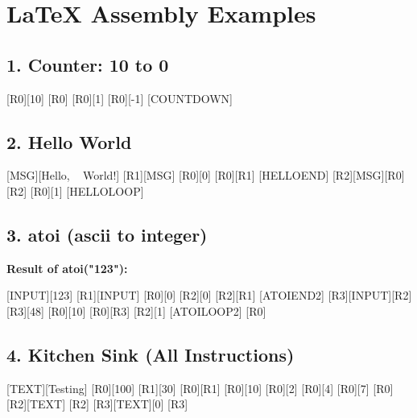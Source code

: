 \documentclass{article}
\begin{document}
\section*{LaTeX Assembly Examples}

\subsection*{1. Counter: 10 to 0}
\begin{latexasm}
    [R0][10]
    [R0]
    [R0][1]
    [R0][-1]
    [COUNTDOWN]
\end{latexasm}

\subsection*{2. Hello World}
\begin{latexasm}
    [MSG][Hello, ~ World!]
    [R1][MSG]
    [R0][0]
    [R0][R1]
    [HELLOEND]
    [R2][MSG][R0]
    [R2]
    [R0][1]
    [HELLOLOOP]
\end{latexasm}

\subsection*{3. atoi (ascii to integer)}
\textbf{Result of atoi("123"):}
\begin{latexasm}%
    [INPUT][123]%
    [R1][INPUT]%
    [R0][0]%
    [R2][0]%
    [R2][R1]%
    [ATOIEND2]%
    [R3][INPUT][R2]%
    [R3][48]%
    [R0][10]%
    [R0][R3]%
    [R2][1]%
    [ATOILOOP2]%
    [R0]%
\end{latexasm}%

\subsection*{4. Kitchen Sink (All Instructions)}
\begin{latexasm}
    [TEXT][Testing]
    [R0][100]
    [R1][30]
    [R0][R1]      %
    [R0][10]      %
    [R0][2]       %
    [R0][4]       %
    [R0][7]       %
    [R0]        %
    [R2][TEXT] %
    [R2]        %
    [R3][TEXT][0]%
    [R3]           %
\end{latexasm}
\end{document}
